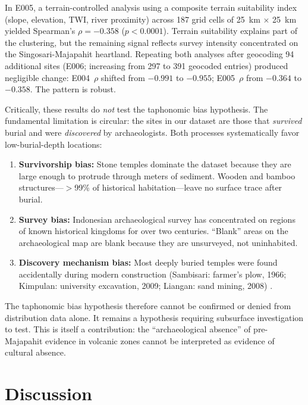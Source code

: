 \documentclass[12pt,letterpaper]{article}
\begin{document}
In E005, a terrain-controlled analysis using a composite terrain suitability index (slope, elevation, TWI, river proximity) across 187 grid cells of 25~km $\times$ 25~km yielded Spearman's $\rho = -0.358$ ($p < 0.0001$). Terrain suitability explains part of the clustering, but the remaining signal reflects survey intensity concentrated on the Singosari-Majapahit heartland. Repeating both analyses after geocoding 94 additional sites (E006; increasing from 297 to 391 geocoded entries) produced negligible change: E004~$\rho$ shifted from $-0.991$ to $-0.955$; E005~$\rho$ from $-0.364$ to $-0.358$. The pattern is robust.

Critically, these results do \textit{not} test the taphonomic bias hypothesis. The fundamental limitation is circular: the sites in our dataset are those that \textit{survived} burial and were \textit{discovered} by archaeologists. Both processes systematically favor low-burial-depth locations:

\begin{enumerate}
  \item \textbf{Survivorship bias:} Stone temples dominate the dataset because they are large enough to protrude through meters of sediment. Wooden and bamboo structures---$>$99\% of historical habitation---leave no surface trace after burial.
  \item \textbf{Survey bias:} Indonesian archaeological survey has concentrated on regions of known historical kingdoms for over two centuries. ``Blank'' areas on the archaeological map are blank because they are unsurveyed, not uninhabited.
  \item \textbf{Discovery mechanism bias:} Most deeply buried temples were found accidentally during modern construction (Sambisari: farmer's plow, 1966; Kimpulan: university excavation, 2009; Liangan: sand mining, 2008) \citep{putra2019,abbas2016}.
\end{enumerate}

The taphonomic bias hypothesis therefore cannot be confirmed or denied from distribution data alone. It remains a hypothesis requiring subsurface investigation to test. This is itself a contribution: the ``archaeological absence'' of pre-Majapahit evidence in volcanic zones cannot be interpreted as evidence of cultural absence.

\section{Discussion}
\end{document}
